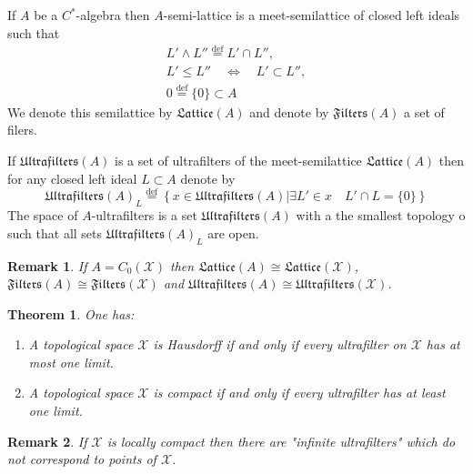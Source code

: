 \documentclass{beamer}
\theoremstyle{plain}
\newtheorem{rem}{Remark}
\newtheorem{thm}{Theorem}%
\newcommand{\be}{\begin{equation}}
\newcommand{\ee}{\end{equation}}
\newcommand{\sX}{\mathcal{X}}       %
\newcommand{\bydef}{\stackrel{\mathrm{def}}{=}}
\begin{document}
	\begin{frame}
\begin{definition}\label{lattice_a_defn}
	If $A$ be a $C^*$-algebra then $A$-\alert{semi}-\alert{lattice} is a meet-semilattice of closed left ideals such that 
	\be\label{meet_eqn}
	\begin{split}
		L' \wedge L''\bydef L' \cap L'',\\
		L' \le L'' \quad \Leftrightarrow\quad L' \subset L'',\\
		0 \bydef \{0\}\subset A
	\end{split}
	\ee
	We denote this semilattice by $\mathfrak{Lattice}\left( A\right)$ and denote by $\mathfrak{Filters}\left( A\right)$  a set of filers.
\end{definition}
\begin{definition}\label{ultrafilters_space_defn}
	If $\mathfrak{Ultrafilters}\left(A \right)$ is a set of ultrafilters of the meet-semilattice $\mathfrak{Lattice}\left( A\right)$ then for any closed left ideal $L \subset A$ denote by
	$$
	\mathfrak{Ultrafilters}\left(A \right)_L	\bydef \left\{\left. x \in \mathfrak{Ultrafilters}\left(A \right) \right| \exists L' \in x\quad L'\cap L = \{0\} \right\}
	$$
	The \alert{space of} $A$-\alert{ultrafilters} is a set $\mathfrak{Ultrafilters}\left(A \right)$ with a  the smallest topology o such that all sets $\mathfrak{Ultrafilters}\left(A \right)_L$ are open.
	
\end{definition}
\end{frame}
\begin{frame}

\begin{rem}
If $A = C_0\left( \sX\right)$ then $\mathfrak{Lattice}\left( A\right)\cong \mathfrak{Lattice}\left(\sX\right)$, $\mathfrak{Filters}\left( A\right)\cong \mathfrak{Filters}\left(\sX\right)$ and $\mathfrak{Ultrafilters}\left( A\right)\cong \mathfrak{Ultrafilters}\left(\sX\right)$.
\end{rem}
\begin{thm}
	One has:
	\begin{enumerate}
		\item [(a)] 	A topological space $\sX$ is Hausdorff if and only if every ultrafilter on $\sX$ has at most one limit.
		\item[(b)]   	A topological space $\sX$ is compact if and only if every ultrafilter has at least one limit.
	\end{enumerate} 
\end{thm}	
\begin{rem}
	If $\sX$ is locally compact then there are "infinite ultrafilters" which do not correspond to points of $\sX$.
\end{rem}
\end{frame}
\end{document}
